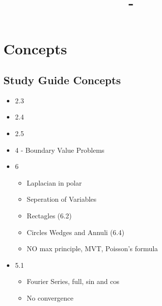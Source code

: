 \documentclass[answers,12pt,addpoints]{exam}
\author{\name}
\title{\course \ - \assignment}
\begin{document}
\maketitle

\tableofcontents

\newpage

\section{Concepts}
\subsection{Study Guide Concepts}
\begin{itemize}
    \item 2.3
    \item 2.4
    \item 2.5
    \item 4 - Boundary Value Problems
    \item 6
    \begin{itemize}
        \item Laplacian in polar
        \item Seperation of Variables
        \item Rectagles (6.2)
        \item Circles Wedges and Annuli (6.4)
        \item NO max principle, MVT, Poisson's formula
    \end{itemize}
    \item 5.1
    \begin{itemize}
        \item Fourier Series, full, sin and cos
        \item No convergence
    \end{itemize}
\end{itemize}
\end{document}
